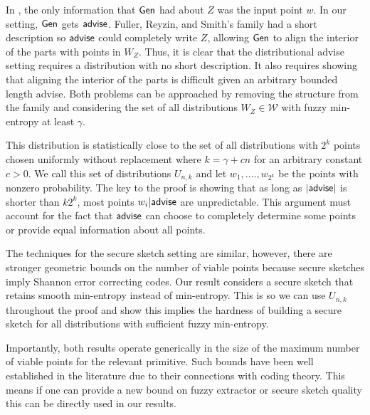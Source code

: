 In \cite{fuller2020fuzzy}, the only information that ${\mathsf{Gen}}$ had about $Z$ was the input point $w$.  In our setting, ${\mathsf{Gen}}$ gets ${\mathsf{advise}}$.  Fuller, Reyzin, and Smith's family had a short description so ${\mathsf{advise}}$ could completely write $Z$, allowing ${\mathsf{Gen}}$ to align the interior of the parts with points in $W_Z$.  Thus, it is clear that the distributional advise  setting requires a distribution with no short description.  It also requires showing that aligning the interior of the parts is difficult given an arbitrary bounded length advise.  Both problems can be approached by removing the structure from the family and considering the set of all distributions $W_Z\in\mathcal{W}$ with fuzzy min-entropy at least $\gamma$. 

This distribution is statistically close to the set of all distributions with $2^k$ points chosen uniformly without replacement where $k = \gamma +cn$ for an arbitrary constant $c>0$.   We call this set of distributions $U_{n,k}$ and let $w_1,...., w_{2^k}$ be the points with nonzero probability.  The key to the proof is showing that as long as $|{\mathsf{advise}}|$ is shorter than $k2^k$, most points $w_i | {\mathsf{advise}}$ are unpredictable.  This argument must account for the fact that ${\mathsf{advise}}$ can choose to completely determine some points or provide equal information about all points. 

The techniques for the secure sketch setting are similar, however, there are stronger geometric bounds on the number of viable points because secure sketches imply Shannon error correcting codes.  Our result considers a secure sketch that retains smooth min-entropy instead of min-entropy.  This is so we can use $U_{n,k}$ throughout the proof and show this implies the hardness of building a secure sketch for all distributions with sufficient fuzzy min-entropy.  

Importantly, both results operate generically in the size of the maximum number of viable points for the relevant primitive.  Such bounds have been well established in the literature due to their connections with coding theory.  This means if one can provide a new bound on fuzzy extractor or secure sketch quality this can be directly used in our results.



